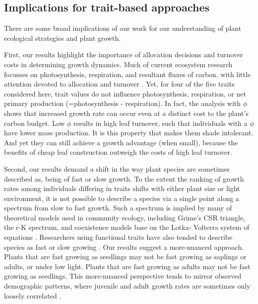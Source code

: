 \documentclass[a4paper,11pt]{article}
\begin{document}
\subsection{Implications for trait-based approaches}

There are some broad implications of our work for our understanding of plant ecological strategies and plant growth.

First, our results highlight the importance of allocation decisions and turnover costs in determining growth dynamics. Much of current ecosystem research focusses on  photosynthesis, respiration, and resultant fluxes of carbon, with little attention devoted to allocation and turnover \citep[for comparisons of models see][]{Sitch-2008, DeKauwe-2014}. Yet, for four of the five traits considered here, trait values do not influence photosynthesis, respiration, or net primary production (=photosynthesis - respiration). In fact, the analysis with $\phi$ shows that increased growth rate can occur even at a distinct cost to the plant's carbon budget. Low $\phi$ results in high leaf turnover, such that individuals with a $\phi$ have lower mass production. It is this property that makes them shade intolerant. And yet they can still achieve a growth advantage (when small), because the benefits of cheap leaf construction outweigh the costs of high leaf turnover.


Second, our results demand a shift in the way plant species are sometimes described as, being of fast or slow growth. To the extent the ranking of growth rates among individuals differing in traits shifts with either plant size or light environment, it is not possible to describe a species via a single point along a spectrum from slow to fast growth. Such a spectrum is implied by many of theoretical models used in community ecology, including Grime's \textsc{CSR} triangle, the r-K spectrum, and coexistence models base on the Lotka- Volterra system of equations \citep[e.g.][]{Grime-1977,Chesson-2000}. Researchers using functional traits have also tended to describe species as fast or slow growing \citep[e.g.][]{Adler-2014,Diaz-2016}. Our results suggest a more-nuanced approach. Plants that are fast growing as seedlings may not be fast growing as saplings or adults, or under low light. Plants that are fast growing as adults may not be fast growing as seedlings. This more-nuanced perspective tends to mirror observed demographic patterns, where juvenile and adult growth rates are sometimes only loosely correlated \citep{Rees-2001}.
\end{document}
